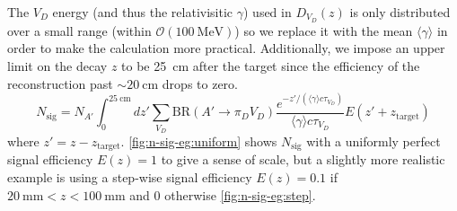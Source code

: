The $V_D$ energy (and thus the relativisitic $\gamma$) used in $D_{V_D}(z)$
is only distributed over a small range (within $\mathcal{O}(\qty{100}{\MeV})$)
so we replace it with the mean $\langle\gamma\rangle$ in order to make the
calculation more practical.
Additionally, we impose an upper limit on the decay $z$ to be \qty{25}{\cm} after
the target since the efficiency of the reconstruction past $\sim\qty{20}{\cm}$ drops to zero.
\begin{equation}
  N_\mathrm{sig} = N_{A'}
    \int_{0}^{\qty{25}{\cm}} dz'
    \sum_{V_D} \mathrm{BR}(A'\to\pi_D V_D)
    \frac{e^{-z'/(\langle\gamma\rangle c \tau_{V_D})}}{\langle\gamma\rangle c \tau_{V_D}}
    E(z'+z_\mathrm{target})
\end{equation}
where $z' = z-z_\mathrm{target}$.
\cref{fig:n-sig-eg:uniform} shows $N_\mathrm{sig}$ with a uniformly perfect signal efficiency
$E(z) = 1$ to give a sense of scale, but a slightly more realistic example is using a
step-wise signal efficiency $E(z) = 0.1$ if $\qty{20}{\mm} < z < \qty{100}{\mm}$ and $0$ otherwise
\cref{fig:n-sig-eg:step}.

